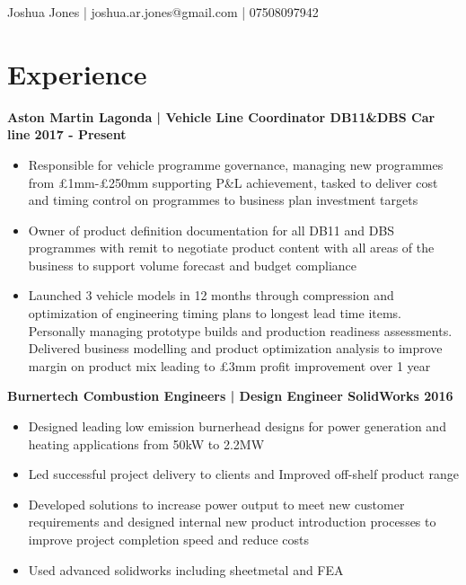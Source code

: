 \documentclass[10pt]{article} %
\begin{document}
{\large

 \hfill 	Joshua Jones | 
joshua.ar.jones@gmail.com |
07508097942}

\vspace{-1cm}
\raggedright
\section*{ Experience}

\vspace{-0.25cm}

{\bf  Aston Martin Lagonda | Vehicle Line Coordinator DB11\&DBS Car line \hfill 2017 - Present}
\begin{itemize}
\item Responsible for vehicle programme governance, managing new programmes from £1mm-£250mm supporting P\&L achievement, tasked to deliver cost and timing control on programmes to business plan investment targets
\item Owner of product definition documentation for all DB11 and DBS programmes with remit to negotiate product content with all areas of the business to support volume forecast and budget compliance
\item Launched 3 vehicle models in 12 months through  compression and optimization of engineering timing plans to longest lead time items. Personally managing prototype builds and production readiness assessments. Delivered business modelling and product optimization analysis to improve margin on product mix leading to £3mm profit improvement over 1 year
\end{itemize}


{\bf  Burnertech Combustion Engineers | Design Engineer SolidWorks \hfill 2016}\\
\begin{itemize}

\item Designed leading low emission burnerhead designs for power generation and heating applications from 50kW to 2.2MW
\item Led successful project delivery to clients and Improved off-shelf product range
\item Developed  solutions to increase power output to meet new customer requirements and designed internal new product introduction processes to improve project completion speed and reduce costs
\item  Used advanced solidworks including sheetmetal and FEA

\end{itemize}
\end{document}
